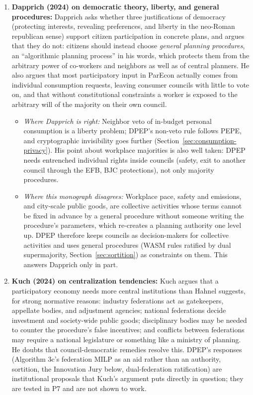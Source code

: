 \documentclass[10pt,twoside,openany]{book}
\theoremstyle{dpepstyle}
\begin{document}
\begin{enumerate}[leftmargin=1.8em,itemsep=3pt]
  \item \textbf{Dapprich (2024) on democratic theory, liberty, and general procedures:} Dapprich asks whether three justifications of democracy (protecting interests, revealing preferences, and liberty in the neo-Roman republican sense) support citizen participation in concrete plans, and argues that they do not: citizens should instead choose \emph{general planning procedures}, an ``algorithmic planning process'' in his words, which protects them from the arbitrary power of co-workers and neighbors as well as of central planners. He also argues that most participatory input in ParEcon actually comes from individual consumption requests, leaving consumer councils with little to vote on, and that without constitutional constraints a worker is exposed to the arbitrary will of the majority on their own council.
  \begin{itemize}[leftmargin=1.4em,itemsep=1pt]
    \item \emph{Where Dapprich is right:} Neighbor veto of in-budget personal consumption is a liberty problem; DPEP's non-veto rule follows PEPE, and cryptographic invisibility goes further (Section~\ref{sec:consumption-privacy}). His point about workplace majorities is also well taken: DPEP needs entrenched individual rights inside councils (safety, exit to another council through the EFB, BJC protections), not only majority procedures.
    \item \emph{Where this monograph disagrees:} Workplace pace, safety and emissions, and city-scale public goods, are collective activities whose terms cannot be fixed in advance by a general procedure without someone writing the procedure's parameters, which re-creates a planning authority one level up. DPEP therefore keeps councils as decision-makers for collective activities and uses general procedures (WASM rules ratified by dual supermajority, Section~\ref{sec:sortition}) as constraints on them. This answers Dapprich only in part.
  \end{itemize}
  \item \textbf{Kuch (2024) on centralization tendencies:} Kuch argues that a participatory economy needs more central institutions than Hahnel suggests, for strong normative reasons: industry federations act as gatekeepers, appellate bodies, and adjustment agencies; national federations decide investment and society-wide public goods; disciplinary bodies may be needed to counter the procedure's false incentives; and conflicts between federations may require a national legislature or something like a ministry of planning. He doubts that council-democratic remedies resolve this. DPEP's responses (Algorithm 3c's federation MILP as an aid rather than an authority, sortition, the Innovation Jury below, dual-federation ratification) are institutional proposals that Kuch's argument puts directly in question; they are tested in P7 and are not shown to work.

\end{enumerate}
\end{document}
